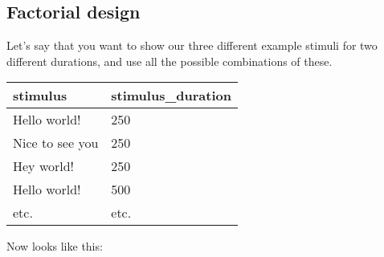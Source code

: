 \documentclass[letterpaper,10pt,english]{sphinxmanual}
\begin{document}
\subsection{Factorial design}
\label{\detokenize{jspsych_au:factorial-design}}
Let’s say that you want to show our three different example stimuli for
two different durations, and use all the possible combinations of these.


\begin{savenotes}\sphinxattablestart
\centering
\begin{tabulary}{\linewidth}[t]{|T|T|}
\hline
\sphinxstyletheadfamily 
stimulus
&\sphinxstyletheadfamily 
stimulus\_duration
\\
\hline
Hello world!
&
250
\\
\hline
Nice to see you
&
250
\\
\hline
Hey world!
&
250
\\
\hline
Hello world!
&
500
\\
\hline
etc.
&
etc.
\\
\hline
\end{tabulary}
\par
\sphinxattableend\end{savenotes}

\begin{sphinxVerbatim}[commandchars=\\\{\}]
   \PYG{p}{[}
\PYG{p}{]}

   \PYG{p}{[} \PYG{p}{]} 

        

  
\end{sphinxVerbatim}

Now  looks like this:
\end{document}
